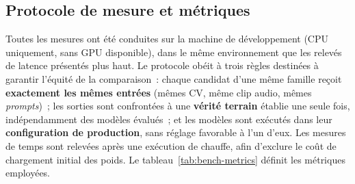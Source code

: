 \subsection{Protocole de mesure et métriques}

Toutes les mesures ont été conduites sur la machine de développement (CPU uniquement, sans GPU
disponible), dans le même environnement que les relevés de latence présentés plus haut. Le
protocole obéit à trois règles destinées à garantir l'équité de la comparaison~: chaque candidat
d'une même famille reçoit \textbf{exactement les mêmes entrées} (mêmes CV, même clip audio, mêmes
\textit{prompts})~; les sorties sont confrontées à une \textbf{vérité terrain} établie une seule
fois, indépendamment des modèles évalués~; et les modèles sont exécutés dans leur
\textbf{configuration de production}, sans réglage favorable à l'un d'eux. Les mesures de temps
sont relevées après une exécution de chauffe, afin d'exclure le coût de chargement initial des
poids. Le tableau~\ref{tab:bench-metrics} définit les métriques employées.

